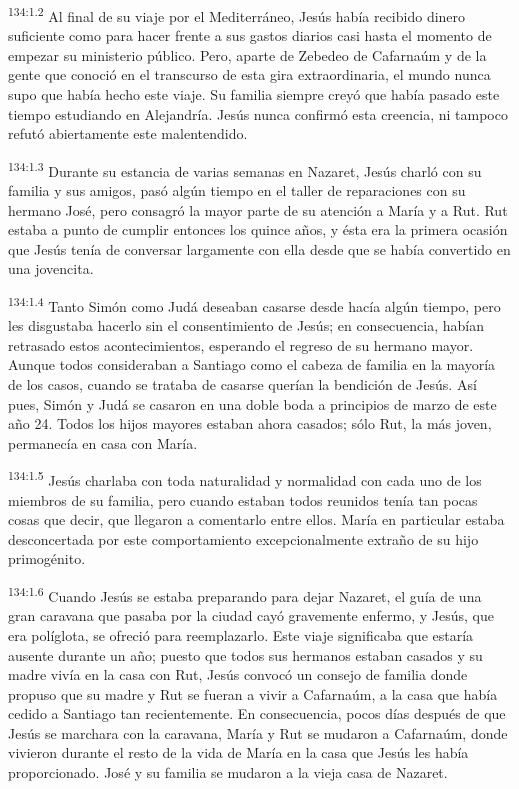\par
\textsuperscript{134:1.2} Al final de su viaje por el Mediterráneo, Jesús había recibido dinero suficiente como para hacer frente a sus gastos diarios casi hasta el momento de empezar su ministerio público. Pero, aparte de Zebedeo de Cafarnaúm y de la gente que conoció en el transcurso de esta gira extraordinaria, el mundo nunca supo que había hecho este viaje. Su familia siempre creyó que había pasado este tiempo estudiando en Alejandría. Jesús nunca confirmó esta creencia, ni tampoco refutó abiertamente este malentendido.

\par
\textsuperscript{134:1.3} Durante su estancia de varias semanas en Nazaret, Jesús charló con su familia y sus amigos, pasó algún tiempo en el taller de reparaciones con su hermano José, pero consagró la mayor parte de su atención a María y a Rut. Rut estaba a punto de cumplir entonces los quince años, y ésta era la primera ocasión que Jesús tenía de conversar largamente con ella desde que se había convertido en una jovencita.

\par
\textsuperscript{134:1.4} Tanto Simón como Judá deseaban casarse desde hacía algún tiempo, pero les disgustaba hacerlo sin el consentimiento de Jesús; en consecuencia, habían retrasado estos acontecimientos, esperando el regreso de su hermano mayor. Aunque todos consideraban a Santiago como el cabeza de familia en la mayoría de los casos, cuando se trataba de casarse querían la bendición de Jesús. Así pues, Simón y Judá se casaron en una doble boda a principios de marzo de este año 24. Todos los hijos mayores estaban ahora casados; sólo Rut, la más joven, permanecía en casa con María.

\par
\textsuperscript{134:1.5} Jesús charlaba con toda naturalidad y normalidad con cada uno de los miembros de su familia, pero cuando estaban todos reunidos tenía tan pocas cosas que decir, que llegaron a comentarlo entre ellos. María en particular estaba desconcertada por este comportamiento excepcionalmente extraño de su hijo primogénito.

\par
\textsuperscript{134:1.6} Cuando Jesús se estaba preparando para dejar Nazaret, el guía de una gran caravana que pasaba por la ciudad cayó gravemente enfermo, y Jesús, que era políglota, se ofreció para reemplazarlo. Este viaje significaba que estaría ausente durante un año; puesto que todos sus hermanos estaban casados y su madre vivía en la casa con Rut, Jesús convocó un consejo de familia donde propuso que su madre y Rut se fueran a vivir a Cafarnaúm, a la casa que había cedido a Santiago tan recientemente. En consecuencia, pocos días después de que Jesús se marchara con la caravana, María y Rut se mudaron a Cafarnaúm, donde vivieron durante el resto de la vida de María en la casa que Jesús les había proporcionado. José y su familia se mudaron a la vieja casa de Nazaret.


